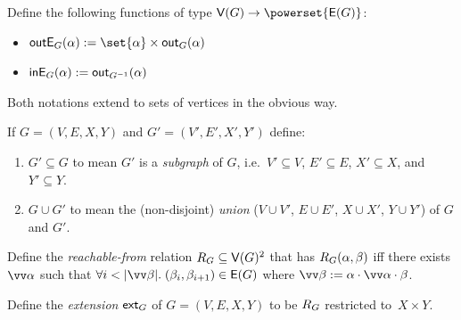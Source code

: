 \begin{definition}[Edges]
   Define the following functions of type $\V(G) \to \powerset{\E(G)}$:
   \begin{itemize}
      \item $\outE{G}(\alpha) \eqdef \set{\alpha} \times \outN{G}(\alpha)$
      \item $\textup{\textsf{inE}}_{G}(\alpha) := \textup{\textsf{out}}_{G^{-1}}(\alpha)$
   \end{itemize}
\end{definition}

\noindent Both notations extend to sets of vertices in the obvious way.

\begin{definition}
   If $G = (V, E, X, Y)$ and $G' = (V', E', X', Y')$ define:
   \begin{enumerate}
      \item $G' \subseteq G$ to mean $G'$ is a \emph{subgraph} of $G$, i.e.~$V' \subseteq V$, $E' \subseteq E$, $X' \subseteq X$, and $Y' \subseteq Y$.
      \item $G \cup G'$ to mean the (non-disjoint) \emph{union} ($V \cup V'$, $E \cup E'$, $X \cup X'$, $Y \cup Y'$) of $G$ and $G'$.
   \end{enumerate}
\end{definition}

\begin{definition}[Reachable]
   Define the \emph{reachable-from} relation $R_{G} \subseteq \textup{\textsf{V}}(G)^2$ that has $R_{G}(\alpha,
   \beta)$ iff there exists $\seq{\alpha}$ such that $\forall i < \length{\seq{\beta}}.\;(\beta_i,\beta_{i+1})
   \in \E(G)$ where $\seq{\beta} \eqdef \alpha \cons \seq{\alpha} \cons \beta$.
\end{definition}


\begin{definition}[Extension]
   Define the \emph{extension} $\textup{\textsf{ext}}_{G}$ of $G = (V, E, X, Y)$ to be $R_{G}$ restricted to~$X \times Y$.
\end{definition}

